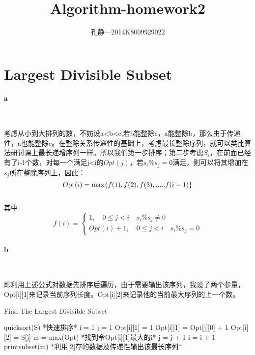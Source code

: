 \documentclass{article}
\author{孔静—2014K8009929022}
\title{Algorithm-homework2}
\begin{document}
   
	\maketitle
	\tableofcontents
	\section{Largest Divisible Subset}
		\paragraph{a}\
		
			考虑从小到大排列的数，不妨设a<b<c,若b能整除c，a能整除b，那么由于传递性，a也能整除c。在整除关系传递性的基础上，考虑最长整除序列，就可以类比算法研讨课上最长递增序列一样。所以我们第一步排序；第二步考虑$S_i$，在前面已经有了i-1个数，对每一个满足j<i的$Opt(j)$，若$s_i\%s_j=0$满足，则可以将其增加在$s_j$所在整除序列上，因此：
			\\
			\[O{\rm{pt}}(i) = \max \{ f(1),f(2),f(3),.....f(i - 1){\rm{\} }}\] 
			\\其中\[f(i) = \left\{ {\begin{array}{*{20}{l}}{1,\quad 0 \le j < i\quad {s_i}\% {s_j} \ne 0}\\{Opt(i) + 1,\quad 0 \le j < i\quad {s_i}\% {s_j} = 0}\end{array}} \right.\]
			
		\paragraph{b}\
		
			即利用上述公式对数据先排序后遍历，由于需要输出该序列，我设了两个参量，Opt[i][1]来记录当前序列长度。Opt[i][2]来记录他的当前最大序列的上一个数。
		\newpage
		\begin{algorithm}
		\caption{Find The Largest Divisible Subset}
		\begin{algorithmic}
		\State quicksort(S)  *快速排序*
		\State i = 1
		\State j = 1
		\State Opt[i][1] = 1
		\State Opt[i][1] = Opt[j][0] + 1
		\State Opt[i][2] = S[j]
		\EndIf
		\EndIf
		\State m = max(Opt) *找到令Opt[i][1]最大的i*
		\State j = j + 1
		\EndFor
		\State i = i + 1
		\EndFor
		\State printsubset(m) *利用[2]存的数据及传递性输出该最长序列*
		\EndProcedure
		\end{algorithmic}
		\end{algorithm}
		
\end{document}
